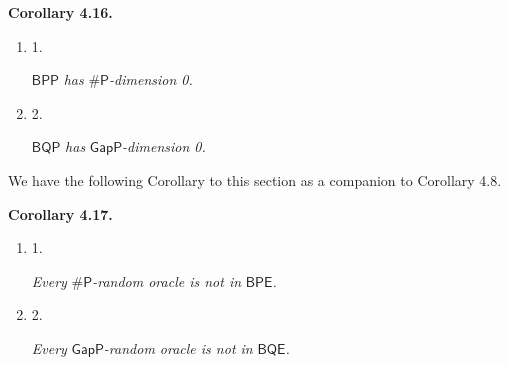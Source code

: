 \documentclass[10pt,a4paper]{article}
\begin{document}




\par\medskip\noindent\textbf{
\textbf{Corollary 4.16}\textbf{.}
}\par



\begin{enumerate}


\item[] 
1. 


$\mathsf{BPP}$\emph{ has }${\mathsf{\#}\mathsf{P}}$\emph{-dimension 0.}\par





\item[] 
2. 


$\mathsf{BQP}$\emph{ has }$\mathsf{GapP}$\emph{-dimension 0.}\par





\end{enumerate}






We have the following Corollary to this section as a companion to Corollary 4.8.\par





\par\medskip\noindent\textbf{
\textbf{Corollary 4.17}\textbf{.}
}\par



\begin{enumerate}


\item[] 
1. 


\emph{Every }${\mathsf{\#}\mathsf{P}}$\emph{-random oracle is not in }$\mathsf{BPE}$\emph{.}\par





\item[] 
2. 


\emph{Every }$\mathsf{GapP}$\emph{-random oracle is not in }$\mathsf{BQE}$\emph{.}\par





\end{enumerate}
\end{document}
